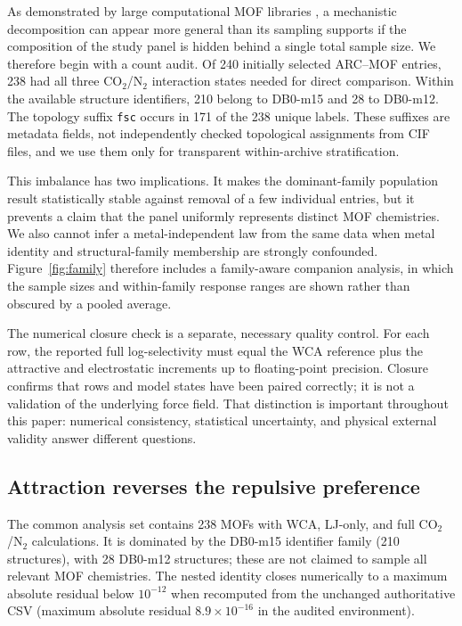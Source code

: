 \documentclass[journal=jctcce,manuscript=article]{achemso}
\begin{document}
As demonstrated by large computational MOF libraries \cite{chung2019core,burner2023arcmof}, a mechanistic decomposition can appear more general than its sampling supports if the composition of the study panel is hidden behind a single total sample size. We therefore begin with a count audit. Of 240 initially selected ARC--MOF entries, 238 had all three CO$_2$/N$_2$ interaction states needed for direct comparison. Within the available structure identifiers, 210 belong to DB0-m15 and 28 to DB0-m12. The topology suffix \texttt{fsc} occurs in 171 of the 238 unique labels. These suffixes are metadata fields, not independently checked topological assignments from CIF files, and we use them only for transparent within-archive stratification.

This imbalance has two implications. It makes the dominant-family population result statistically stable against removal of a few individual entries, but it prevents a claim that the panel uniformly represents distinct MOF chemistries. We also cannot infer a metal-independent law from the same data when metal identity and structural-family membership are strongly confounded. Figure~\ref{fig:family} therefore includes a family-aware companion analysis, in which the sample sizes and within-family response ranges are shown rather than obscured by a pooled average.

The numerical closure check is a separate, necessary quality control. For each row, the reported full log-selectivity must equal the WCA reference plus the attractive and electrostatic increments up to floating-point precision. Closure confirms that rows and model states have been paired correctly; it is not a validation of the underlying force field. That distinction is important throughout this paper: numerical consistency, statistical uncertainty, and physical external validity answer different questions.


\subsection{Attraction reverses the repulsive preference}

The common analysis set contains 238 MOFs with WCA, LJ-only, and full CO$_2$/N$_2$ calculations. It is dominated by the DB0-m15 identifier family (210 structures), with 28 DB0-m12 structures; these are not claimed to sample all relevant MOF chemistries. The nested identity closes numerically to a maximum absolute residual below $10^{-12}$ when recomputed from the unchanged authoritative CSV (maximum absolute residual $8.9\times10^{-16}$ in the audited environment).
\end{document}
